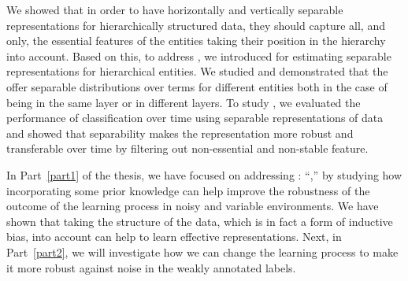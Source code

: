 We showed that in order to have horizontally and vertically separable representations for hierarchically structured data, they should capture all, and only, the essential features of the entities taking their position in the hierarchy into account. Based on this, to address \textbf{}, we introduced \hswlms for estimating separable representations for hierarchical entities. We studied \achswlms and demonstrated that the offer separable distributions over terms for different entities both in the case of being in the same layer or in different layers. To study \textbf{}, we evaluated the performance of classification over time using separable representations of data and showed that separability makes the representation more robust and transferable over time by filtering out non-essential and non-stable feature.

\bigskip
In Part~\ref{part1} of the thesis, we have focused on addressing \textbf{}: ``\emph{},'' by studying how incorporating some prior knowledge can help improve the robustness of the outcome of the learning process in noisy and variable environments. We have shown that taking the structure of the data, which is in fact a form of inductive bias, into account can help to learn effective representations. Next, in Part~\ref{part2}, we will investigate how we can change the learning process to make it more robust against noise in the weakly annotated labels.